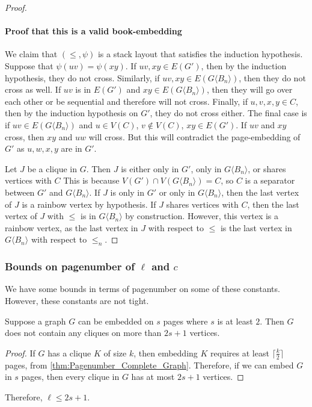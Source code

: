 \begin{proof}
	\paragraph{Proof that this is a valid book-embedding}
	We claim that \((\leq , \psi)\) is a stack layout that satisfies the induction hypothesis. Suppose that \(\psi(uv) = \psi(xy)\). If \(uv, xy \in E(G')\), then by the induction hypothesis, they do not cross. Similarly, if \(uv, xy \in E(G \langle B_n \rangle)\), then they do not cross as well. If \(uv\) is in \(E(G')\) and \(xy \in E(G \langle B_n \rangle)\), then they will go over each other or be sequential and therefore will not cross.
	Finally, if \(u, v, x, y \in C\), then by the induction hypothesis on \(G'\), they do not cross either. The final case is if \(uv \in E(G\langle B_{n} \rangle)\) and \(u \in V(C)\), \(v \notin V(C)\), \(xy \in E(G')\). If \(uv\) and \(xy\) cross, then \(xy\) and \(uw\) will cross. But this will contradict the page-embedding of \(G'\) as $u, w, x, y$ are in $G'$.

	Let \(J\) be a clique in \(G\). Then $J$ is either only in $G'$, only in $G\langle B_n \rangle$, or shares vertices with $C$ This is because $V(G') \cap V(G\langle B_n \rangle) = C$, so $C$ is a separator between $G'$ and $G \langle B_n \rangle$. If $J$ is only in $G'$ or only in $G\langle B_n \rangle$, then the last vertex of $J$ is a rainbow vertex by hypothesis. If $J$ shares vertices with $C$, then the last vertex of $J$ with $\leq$ is in $G\langle B_n \rangle$ by construction. However, this vertex is a rainbow vertex, as the last vertex in $J$ with respect to $\leq$ is the last vertex in $G\langle B_n \rangle$ with respect to $\leq_n$. 
\end{proof}

\subsubsection{Bounds on pagenumber of \(\ell\) and \(c\)}

We have some bounds in terms of pagenumber on some of these constants. However, these constants are not tight. 

\begin{lemma}
	Suppose a graph $G$ can be embedded on $s$ pages where $s$ is at least $2$. Then \(G\) does not contain any cliques on more than \(2s+1\) vertices.
\end{lemma}

\begin{proof}
	If \(G\) has a clique $K$ of size \(k\), then embedding $K$ requires at least \(\lceil \frac{k}{2} \rceil\) pages, from \cref{thm:Pagenumber_Complete_Graph}. Therefore, if we can embed \(G\) in \(s\) pages, then every clique in $G$ has at most \(2s + 1\) vertices.
\end{proof}
Therefore, \(\ell \leq 2s + 1\).

